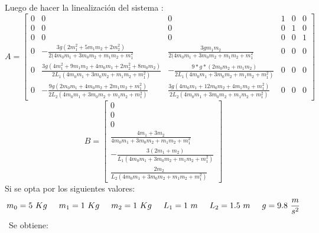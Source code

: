 Luego de hacer la linealización del sistema :
\begin{equation}
 A = \begin{bmatrix}
0 &  0 & 0 & 1 &  0 & 0\\

0 &  0 & 0 & 0 &  1 & 0\\
0 &  0 & 0 & 0 &  0 & 1\\

0 &  -\frac{3g(2m_1^2 + 5m_1m_2 + 2m_2^2)}{2(4m_0m_1 + 3m_0m_2 + m_1m_2 + m_1^2} & 
\frac{3gm_1m_2}{2(4m_0m_1 + 3m_0m_2 + m_1m_2 + m_1^2}  & 0 &  0 & 0\\

0 &  \frac{3g(4m_1^2 + 9m_1m_2 + 4m_0m_1 + 2m_2^2 + 8m_0m_2)}{2L_1(4m_0m_1 + 3m_0m_2 + m_1m_2 + m_1^2)} & -\frac{9*g*(2m_0m_2 + m_1m_2)}{2L_1(4m_0m_1 + 3m_0m_2 + m_1m_2 + m_1^2)}
 & 0 &  0 & 0\\

0 &   -\frac{9g(2m_0m_1 + 4m_0m_2 + 2m_1m_2 + m_1^2)}{2L_2(4m_0m_1 + 3m_0m_2 + m_1m_2 + m_1^2)} & \frac{3g(4m_0m_1 + 12m_0m_2 + 4m_1m_2 + m_1^2)}{2L_2(4m_0m_1 + 3m_0m_2 + m_1m_2 + m_1^2)} & 0 &  0 & 0
\end{bmatrix}
\end{equation}
\begin{equation}
 B = \begin{bmatrix}
0 \\
0 \\
0 \\
\frac{4m_1 + 3m_2}{4m_0m_1 + 3m_0m_2 + m_1m_2 + m_1^2} \\
 -\frac{3(2m_1 + m_2)}{L_1(4m_0m_1 + 3m_0m_2 + m_1m_2 + m_1^2)} \\
\frac{2m_2}{L_2(4m_0m_1 + 3m_0m_2 + m_1m_2 + m_1^2)}
\end{bmatrix}
\end{equation}
Si se opta por los siguientes valores:
\begin{equation}
m_0 = 5 \ Kg
\hspace{0.5cm}
m_1 = 1 \ Kg
\hspace{0.5cm}
m_2 = 1 \ Kg
\hspace{0.5cm}
L_1 = 1 \ m
\hspace{0.5cm}
L_2 = 1.5 \ m
\hspace{0.5cm}
g= 9.8 \ \frac{m}{s^2}
\end{equation}
\
Se obtiene:


